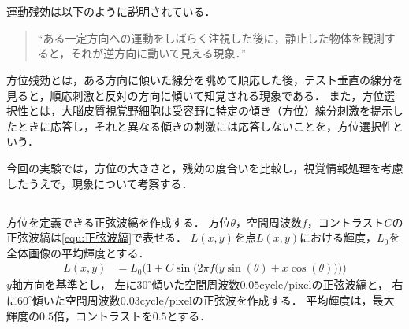 \chapter{\kadaic}
\section{\purpose}
運動残効は以下のように説明されている．
\begin{quote}
    ``ある一定方向への運動をしばらく注視した後に，静止した物体を観測すると，それが逆方向に動いて見える現象．''\\
    \hfill\cite[p.58]{認知心理学辞典}
\end{quote}
方位残効とは，ある方向に傾いた線分を眺めて順応した後，テスト垂直の線分を見ると，順応刺激と反対の方向に傾いて知覚される現象である\cite[p.5]{方位残効と運動残効のメカニズム}．
また，方位選択性とは，大脳皮質視覚野細胞は受容野に特定の傾き（方位）線分刺激を提示したときに応答し，それと異なる傾きの刺激には応答しないことを，方位選択性という\cite[p.764]{認知心理学辞典}．\par
今回の実験では，方位の大きさと，残効の度合いを比較し，視覚情報処理を考慮したうえで，現象について考察する．
\section{\method}
\paragraph{\kadaica}
方位を定義できる正弦波縞を作成する．
方位\(\theta\)，空間周波数\(f\)，コントラスト\(C\)の正弦波縞は\eqref{equ:正弦波縞}で表せる．
\(L(x,y)\)を点\(L(x,y)\)における輝度，\(L_0\)を全体画像の平均輝度とする．
\begin{align}
    L(x,y) & = L_0\Bigg(1+C\sin\Big(2\pi f\big(y\sin(\theta)+x\cos(\theta)\big)\Big)\Bigg)\label{equ:正弦波縞}
\end{align}
\(y\)軸方向を基準とし，
左に\(30^\circ\)傾いた空間周波数\(0.05\textrm{cycle}/\textrm{pixel}\)の正弦波縞と，
右に\(60^{\circ}\)傾いた空間周波数\(0.03\textrm{cycle}/\textrm{pixel}\)の正弦波を作成する．
平均輝度は，最大輝度の\(0.5\)倍，コントラストを\(0.5\)とする．
